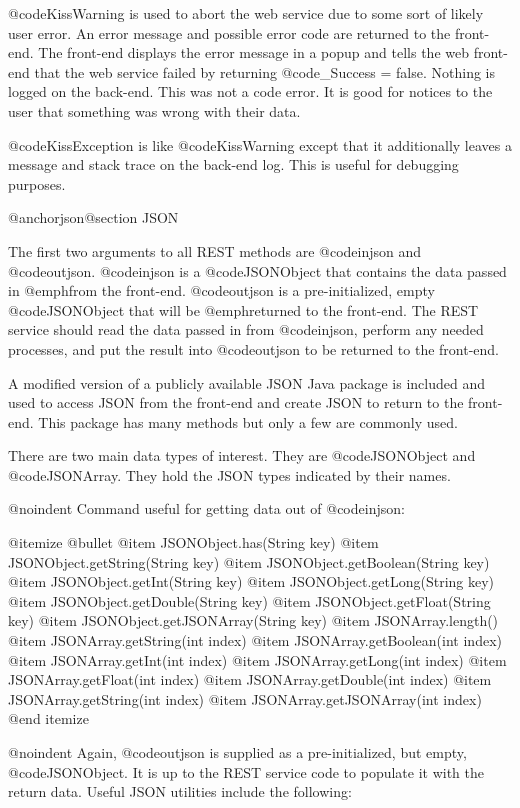 @code{KissWarning} is used to abort the web service due to some sort of likely user error.  An error message and possible error code are returned to the front-end.
The front-end displays the error message in a popup and tells the web front-end that the web service failed by returning @code{_Success = false}.
Nothing is logged on the back-end.  This was not a code error.  It is good for notices to the user that something was wrong with their data.

@code{KissException} is like @code{KissWarning} except that it additionally leaves a message and stack trace on the back-end log.  This is useful
for debugging purposes.

@anchor{json}@section JSON

The first two arguments to all REST methods are @code{injson} and
@code{outjson}.  @code{injson} is a @code{JSONObject} that contains
the data passed in @emph{from} the front-end.  @code{outjson} is a
pre-initialized, empty @code{JSONObject} that will be @emph{returned
to} the front-end.  The REST service should read the data passed in
from @code{injson}, perform any needed processes, and put the result
into @code{outjson} to be returned to the front-end.

A modified version of a publicly available JSON Java package is
included and used to access JSON from the front-end and create JSON to
return to the front-end.  This package has many methods but only a few are
commonly used.

There are two main data types of interest.  They are @code{JSONObject} and
@code{JSONArray}.  They hold the JSON types indicated by their names.

@noindent
Command useful for getting data out of @code{injson}:

@itemize @bullet
@item
JSONObject.has(String key)
@item
JSONObject.getString(String key)
@item
JSONObject.getBoolean(String key)
@item
JSONObject.getInt(String key)
@item
JSONObject.getLong(String key)
@item
JSONObject.getDouble(String key)
@item
JSONObject.getFloat(String key)
@item
JSONObject.getJSONArray(String key)
@item
JSONArray.length()
@item
JSONArray.getString(int index)
@item
JSONArray.getBoolean(int index)
@item
JSONArray.getInt(int index)
@item
JSONArray.getLong(int index)
@item
JSONArray.getFloat(int index)
@item
JSONArray.getDouble(int index)
@item
JSONArray.getString(int index)
@item
JSONArray.getJSONArray(int index)
@end itemize

@noindent
Again, @code{outjson} is supplied as a pre-initialized, but empty,
@code{JSONObject}.  It is up to the REST service code to populate it
with the return data.  Useful JSON utilities include the following:

